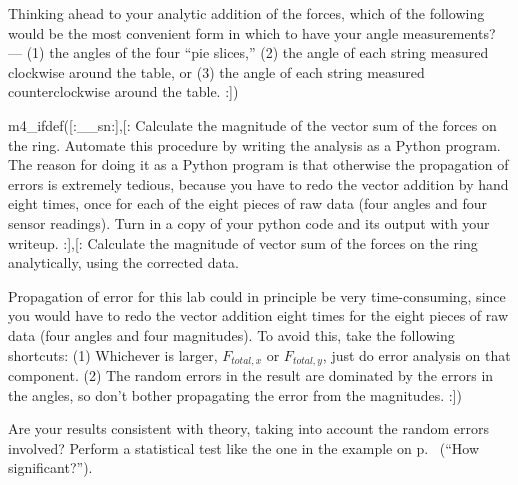 \prelabquestion Thinking ahead to your analytic addition of the forces,
which of the following would be the most convenient form in which to have
your angle measurements? --- (1) the angles of the four ``pie slices,''
(2) the angle of each string measured clockwise around the table,
or (3) the angle of each string measured counterclockwise around the table.
:])

\analysis

m4_ifdef([:__sn:],[:%
Calculate the magnitude of the vector sum of the forces on the
ring. Automate this procedure by writing the analysis as a Python program.
The reason for doing it as a Python program is that otherwise the propagation of errors
is extremely tedious, because you have to redo the vector addition by hand eight times,
once for each of the eight pieces of raw data (four angles and four sensor readings).
Turn in a copy of your python code and its output with your writeup. 
:],[:%
Calculate the magnitude of vector sum of the forces on the
ring analytically, using the corrected data.

Propagation of error for this lab could in principle be very time-consuming,
since you would have to redo the vector addition eight times for the eight
pieces of raw data (four angles and four magnitudes). 
To avoid this, take the following shortcuts: (1) Whichever is larger,
$F_{total,x}$ or $F_{total,y}$, just do error analysis on that component.
(2) The random errors in the result are dominated by the errors in the angles,
so don't bother propagating the error from the magnitudes.
:])

Are your results consistent with theory, taking into account
the random errors involved? Perform a statistical test like the
one in the example on p.~\pageref{eg:fine-structure} (``How significant?'').

